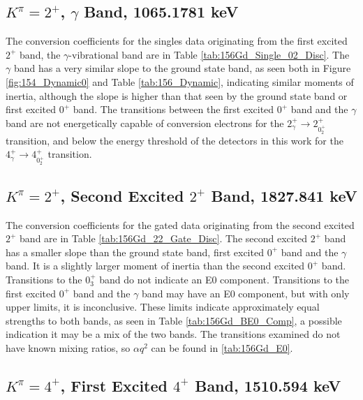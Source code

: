 

\subsection{$K^{\pi}=2^+$, $\gamma$ Band, 1065.1781 keV}

The conversion coefficients for the singles data originating from the first excited $2^+$ band, the $\gamma$-vibrational band are in Table \ref{tab:156Gd_Single_02_Disc}. The $\gamma$ band has a very similar slope to the ground state band, as seen both in Figure \ref{fig:154_Dynamic0} and Table \ref{tab:156_Dynamic}, indicating similar moments of inertia, although the slope is higher than that seen by the ground state band or first excited $0^+$ band. The transitions between the first excited $0^+$ band and the $\gamma$ band are not energetically capable of conversion electrons for the $2^+_{\gamma}\rightarrow 2^+_{0^+_2}$ transition, and below the energy threshold of the detectors in this work for the $4^+_{\gamma}\rightarrow 4^+_{0^+_2}$ transition.



\subsection{$K^{\pi}=2^+$, Second Excited $2^+$ Band, 1827.841 keV}

The conversion coefficients for the gated data originating from the second excited $2^+$ band are in Table \ref{tab:156Gd_22_Gate_Disc}. The second excited $2^+$ band has a smaller slope than the ground state band, first excited $0^+$ band and the $\gamma$ band.  It is a slightly larger moment of inertia than the second excited $0^+$ band. Transitions to the $0^+_3$ band do not indicate an E0 component. Transitions to the first excited $0^+$ band and the $\gamma$ band may have an E0 component, but with only upper limits, it is inconclusive. These limits indicate approximately equal strengths to both bands, as seen in Table \ref{tab:156Gd_BE0_Comp}, a possible indication it may be a mix of the two bands. The transitions examined do not have known mixing ratios, so $\alpha q^2$ can be found in \ref{tab:156Gd_E0}.



\subsection{$K^{\pi}=4^+$, First Excited $4^+$ Band, 1510.594 keV}

